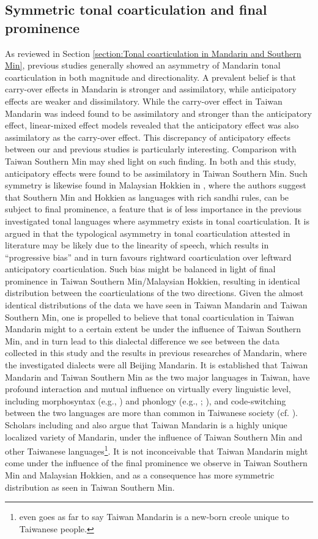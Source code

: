 \subsection{Symmetric tonal coarticulation and final prominence}
As reviewed in Section \ref{section:Tonal coarticulation in Mandarin and Southern Min}, previous studies generally showed an asymmetry of Mandarin tonal coarticulation in both magnitude and directionality. A prevalent belief is that carry-over effects in Mandarin is stronger and assimilatory, while anticipatory effects are weaker and dissimilatory. While the carry-over effect in Taiwan Mandarin was indeed found to be assimilatory and stronger than the anticipatory effect, linear-mixed effect models revealed that the anticipatory effect was also assimilatory as the carry-over effect. This discrepancy of anticipatory effects between our and previous studies is particularly interesting. Comparison with Taiwan Southern Min may shed light on such finding. In both \cite{Peng1997} and this study, anticipatory effects were found to be assimilatory in Taiwan Southern Min. Such symmetry is likewise found in Malaysian Hokkien in \cite{ChangHsieh2012}, where the authors suggest that Southern Min and Hokkien as languages with rich sandhi rules, can be subject to final prominence, a feature that is of less importance in the previous investigated tonal languages where asymmetry exists in tonal coarticulation. It is argued in \cite{ChangHsieh2012} that the typological asymmetry in tonal coarticulation attested in literature may be likely due to the linearity of speech, which results in ``progressive bias'' and in turn favours rightward coarticulation over leftward anticipatory coarticulation. Such bias might be balanced in light of final prominence in Taiwan Southern Min/Malaysian Hokkien, resulting in identical distribution between the coarticulations of the two directions. Given the almost identical distributions of the data we have seen in Taiwan Mandarin and Taiwan Southern Min, one is propelled to believe that tonal coarticulation in Taiwan Mandarin might to a certain extent be under the influence of Taiwan Southern Min, and in turn lead to this dialectal difference we see between the data collected in this study and the results in previous researches of Mandarin, where the investigated dialects were all Beijing Mandarin. It is established that Taiwan Mandarin and Taiwan Southern Min as the two major languages in Taiwan, have profound interaction and mutual influence on virtually every linguistic level, including morphosyntax (e.g., \citealp{Li2008}) and phonlogy (e.g., \citealp{ChuangFon2010}; \citealp{Li2010}), and code-switching between the two languages are more than common in Taiwanese society (cf. \citealp{Yang2021}). Scholars including \cite{Her2012} and \cite{Su2018} also argue that Taiwan Mandarin is a highly unique localized variety of Mandarin, under the influence of Taiwan Southern Min and other Taiwanese languages\footnote{\citeauthor{Her2012} even goes as far to say Taiwan Mandarin is a new-born creole  unique to Taiwanese people.}. It is not inconceivable that Taiwan Mandarin might come under the influence of the final prominence we observe in Taiwan Southern Min and Malaysian Hokkien, and as a consequence has more symmetric distribution as seen in Taiwan Southern Min.


